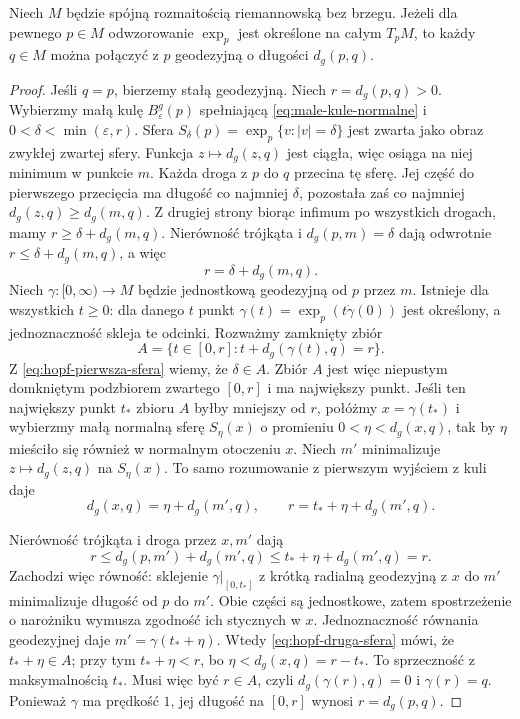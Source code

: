 \begin{lemat}
\label{lem:exp-p-minimalna-kazdy-punkt}
Niech $M$ będzie spójną rozmaitością riemannowską bez brzegu.
Jeżeli dla pewnego $p\in M$ odwzorowanie $\exp_p$ jest określone na całym $T_pM$,
to każdy $q\in M$ można połączyć z $p$
geodezyjną o długości $d_g(p,q)$.
\end{lemat}
\begin{proof}
Jeśli $q=p$, bierzemy stałą geodezyjną.
Niech $r=d_g(p,q)>0$. Wybierzmy małą
kulę $B^g_\varepsilon(p)$ spełniającą
\eqref{eq:male-kule-normalne} i
$0<\delta<\min(\varepsilon,r)$.
Sfera $S_\delta(p)=\exp_p\{v:|v|=\delta\}$
jest zwarta jako obraz zwykłej zwartej sfery.
Funkcja $z\mapsto d_g(z,q)$ jest ciągła,
więc osiąga na niej minimum w punkcie $m$.
Każda droga z $p$ do $q$ przecina tę sferę.
Jej część do pierwszego przecięcia ma długość
co najmniej $\delta$, pozostała zaś co najmniej
$d_g(z,q)\geq d_g(m,q)$. Z drugiej strony
biorąc infimum po wszystkich drogach, mamy
$r\geq\delta+d_g(m,q)$.
Nierówność trójkąta i $d_g(p,m)=\delta$ dają odwrotnie
$r\leq\delta+d_g(m,q)$, a więc
\begin{equation}\label{eq:hopf-pierwsza-sfera}
 r=\delta+d_g(m,q).
\end{equation}
Niech $\gamma:[0,\infty)\to M$ będzie
jednostkową geodezyjną od $p$ przez $m$.
Istnieje dla wszystkich $t\geq0$: dla danego
$t$ punkt $\gamma(t)=\exp_p(t\dot\gamma(0))$
jest określony, a jednoznaczność skleja te odcinki.
Rozważmy zamknięty zbiór
\[
 A=\{t\in[0,r]:t+d_g(\gamma(t),q)=r\}.
\]
Z \eqref{eq:hopf-pierwsza-sfera} wiemy, że
$\delta\in A$. Zbiór $A$ jest więc niepustym domkniętym
podzbiorem zwartego $[0,r]$ i ma największy punkt.
Jeśli ten największy punkt
$t_*$ zbioru $A$ byłby mniejszy od $r$,
połóżmy $x=\gamma(t_*)$ i wybierzmy małą
normalną sferę $S_\eta(x)$ o promieniu
$0<\eta<d_g(x,q)$, tak by $\eta$ mieściło się
również w normalnym otoczeniu $x$.
Niech $m'$ minimalizuje $z\mapsto d_g(z,q)$
na $S_\eta(x)$. To samo rozumowanie
z pierwszym wyjściem z kuli daje
\begin{equation}\label{eq:hopf-druga-sfera}
 d_g(x,q)=\eta+d_g(m',q),\qquad
 r=t_*+\eta+d_g(m',q).
\end{equation}

Nierówność trójkąta i droga przez $x,m'$ dają
\[
 r\leq d_g(p,m')+d_g(m',q)
   \leq t_*+\eta+d_g(m',q)=r.
\]
Zachodzi więc równość: sklejenie $\gamma|_{[0,t_*]}$
z krótką radialną geodezyjną z $x$ do $m'$
minimalizuje długość od $p$ do $m'$.
Obie części są jednostkowe, zatem spostrzeżenie
o narożniku wymusza zgodność ich stycznych w $x$.
Jednoznaczność równania geodezyjnej daje
$m'=\gamma(t_*+\eta)$. Wtedy
\eqref{eq:hopf-druga-sfera} mówi, że
$t_*+\eta\in A$; przy tym $t_*+\eta<r$, bo
$\eta<d_g(x,q)=r-t_*$.
To sprzeczność z maksymalnością
$t_*$. Musi więc być $r\in A$,
czyli $d_g(\gamma(r),q)=0$ i $\gamma(r)=q$.
Ponieważ $\gamma$ ma prędkość $1$,
jej długość na $[0,r]$ wynosi $r=d_g(p,q)$.
\end{proof}

